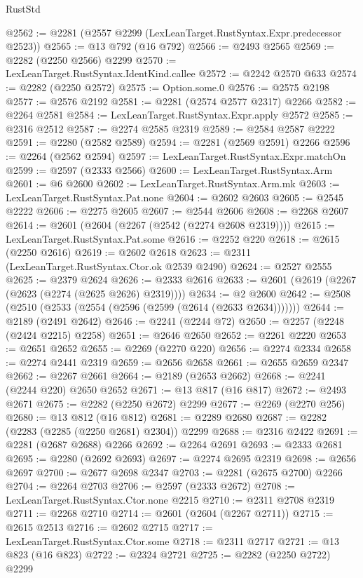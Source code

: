 \begin{lexlean}{RustStd}
\begin{coremodule}
@2562 := @2281 (@2557 @2299 (LexLeanTarget.RustSyntax.Expr.predecessor @2523))
@2565 := @13 @792 (@16 @792)
@2566 := @2493 @2565
@2569 := @2282 (@2250 @2566) @2299
@2570 := LexLeanTarget.RustSyntax.IdentKind.callee
@2572 := @2242 @2570 @633
@2574 := @2282 (@2250 @2572)
@2575 := Option.some.{0}
@2576 := @2575 @2198
@2577 := @2576 @2192
@2581 := @2281 (@2574 @2577 @2317) @2266
@2582 := @2264 @2581
@2584 := LexLeanTarget.RustSyntax.Expr.apply @2572
@2585 := @2316 @2512
@2587 := @2274 @2585 @2319
@2589 := @2584 @2587 @2222
@2591 := @2280 (@2582 @2589)
@2594 := @2281 (@2569 @2591) @2266
@2596 := @2264 (@2562 @2594)
@2597 := LexLeanTarget.RustSyntax.Expr.matchOn
@2599 := @2597 (@2333 @2566)
@2600 := LexLeanTarget.RustSyntax.Arm
@2601 := @6 @2600
@2602 := LexLeanTarget.RustSyntax.Arm.mk
@2603 := LexLeanTarget.RustSyntax.Pat.none
@2604 := @2602 @2603
@2605 := @2545 @2222
@2606 := @2275 @2605
@2607 := @2544 @2606
@2608 := @2268 @2607
@2614 := @2601 (@2604 (@2267 (@2542 (@2274 @2608 @2319))))
@2615 := LexLeanTarget.RustSyntax.Pat.some
@2616 := @2252 @220
@2618 := @2615 (@2250 @2616)
@2619 := @2602 @2618
@2623 := @2311 (LexLeanTarget.RustSyntax.Ctor.ok @2539 @2490)
@2624 := @2527 @2555
@2625 := @2379 @2624
@2626 := @2333 @2616
@2633 := @2601 (@2619 (@2267 (@2623 (@2274 (@2625 @2626) @2319))))
@2634 := @2 @2600
@2642 := @2508 (@2510 (@2533 (@2554 (@2596 (@2599 (@2614 (@2633 @2634)))))))
@2644 := @2189 (@2491 @2642)
@2646 := @2241 (@2244 @72)
@2650 := @2257 (@2248 (@2424 @2215) @2258)
@2651 := @2646 @2650
@2652 := @2261 @2220
@2653 := @2651 @2652
@2655 := @2269 (@2270 @220)
@2656 := @2274 @2334
@2658 := @2274 @2441 @2319
@2659 := @2656 @2658
@2661 := @2655 @2659 @2347
@2662 := @2267 @2661
@2664 := @2189 (@2653 @2662)
@2668 := @2241 (@2244 @220) @2650 @2652
@2671 := @13 @817 (@16 @817)
@2672 := @2493 @2671
@2675 := @2282 (@2250 @2672) @2299
@2677 := @2269 (@2270 @256)
@2680 := @13 @812 (@16 @812)
@2681 := @2289 @2680
@2687 := @2282 (@2283 (@2285 (@2250 @2681) @2304)) @2299
@2688 := @2316 @2422
@2691 := @2281 (@2687 @2688) @2266
@2692 := @2264 @2691
@2693 := @2333 @2681
@2695 := @2280 (@2692 @2693)
@2697 := @2274 @2695 @2319
@2698 := @2656 @2697
@2700 := @2677 @2698 @2347
@2703 := @2281 (@2675 @2700) @2266
@2704 := @2264 @2703
@2706 := @2597 (@2333 @2672)
@2708 := LexLeanTarget.RustSyntax.Ctor.none @2215
@2710 := @2311 @2708 @2319
@2711 := @2268 @2710
@2714 := @2601 (@2604 (@2267 @2711))
@2715 := @2615 @2513
@2716 := @2602 @2715
@2717 := LexLeanTarget.RustSyntax.Ctor.some
@2718 := @2311 @2717
@2721 := @13 @823 (@16 @823)
@2722 := @2324 @2721
@2725 := @2282 (@2250 @2722) @2299

\end{coremodule}
\end{lexlean}
